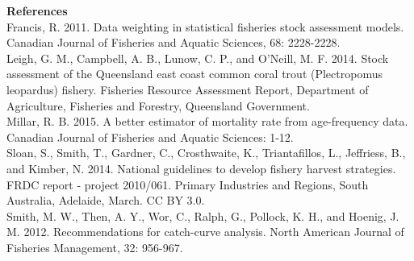 \documentclass[11pt]{article}
\begin{document}
\begin{spacing}{1.2}
\begin{itemize}
\end{itemize}

{\bf References}\\

Francis, R. 2011. Data weighting in statistical fisheries stock assessment models. Canadian Journal of Fisheries and Aquatic Sciences, 68: 2228-2228.\\

Leigh, G. M., Campbell, A. B., Lunow, C. P., and O'Neill, M. F. 2014. Stock assessment of the Queensland east coast common coral trout (Plectropomus leopardus) fishery. Fisheries Resource Assessment Report, Department of Agriculture, Fisheries and Forestry, Queensland Government. \\

Millar, R. B. 2015. A better estimator of mortality rate from age-frequency data. Canadian Journal of Fisheries and Aquatic Sciences: 1-12.\\

Sloan, S., Smith, T., Gardner, C., Crosthwaite, K., Triantafillos, L., Jeffriess, B., and Kimber, N. 2014. National guidelines to develop fishery harvest strategies. FRDC report - project 2010/061. Primary Industries and Regions, South Australia, Adelaide, March. CC BY 3.0. \\

Smith, M. W., Then, A. Y., Wor, C., Ralph, G., Pollock, K. H., and Hoenig, J. M. 2012. Recommendations for catch-curve analysis. North American Journal of Fisheries Management, 32: 956-967.\\




\end{spacing}
\end{document}

